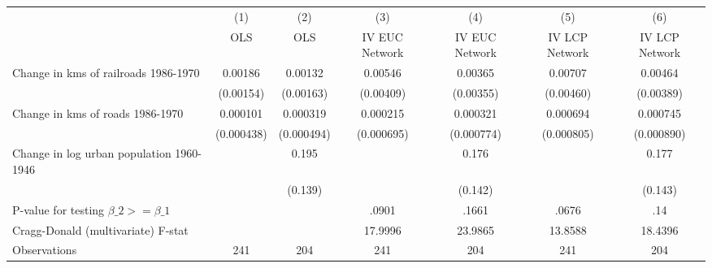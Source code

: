 {
\def\sym#1{\ifmmode^{#1}\else\(^{#1}\)\fi}
\begin{tabular}{l*{6}{c}}
\hline\hline
                &\multicolumn{1}{c}{(1)}&\multicolumn{1}{c}{(2)}&\multicolumn{1}{c}{(3)}&\multicolumn{1}{c}{(4)}&\multicolumn{1}{c}{(5)}&\multicolumn{1}{c}{(6)}\\
                &\multicolumn{1}{c}{OLS}&\multicolumn{1}{c}{OLS}&\multicolumn{1}{c}{IV EUC Network}&\multicolumn{1}{c}{IV EUC Network}&\multicolumn{1}{c}{IV LCP Network}&\multicolumn{1}{c}{IV LCP Network}\\
\hline
Change in kms of railroads 1986-1970&  0.00186         &  0.00132         &  0.00546         &  0.00365         &  0.00707         &  0.00464         \\
                &(0.00154)         &(0.00163)         &(0.00409)         &(0.00355)         &(0.00460)         &(0.00389)         \\
[1em]
Change in kms of roads 1986-1970& 0.000101         & 0.000319         & 0.000215         & 0.000321         & 0.000694         & 0.000745         \\
                &(0.000438)         &(0.000494)         &(0.000695)         &(0.000774)         &(0.000805)         &(0.000890)         \\
[1em]
Change in log urban population 1960-1946&                  &    0.195         &                  &    0.176         &                  &    0.177         \\
                &                  &  (0.139)         &                  &  (0.142)         &                  &  (0.143)         \\
\hline
P-value for testing $\beta\_{2} >= \beta\_{1}$&                  &                  &    .0901         &    .1661         &    .0676         &      .14         \\
Cragg-Donald (multivariate) F-stat&                  &                  &  17.9996         &  23.9865         &  13.8588         &  18.4396         \\
Observations    &      241         &      204         &      241         &      204         &      241         &      204         \\
\hline\hline
\end{tabular}
}
